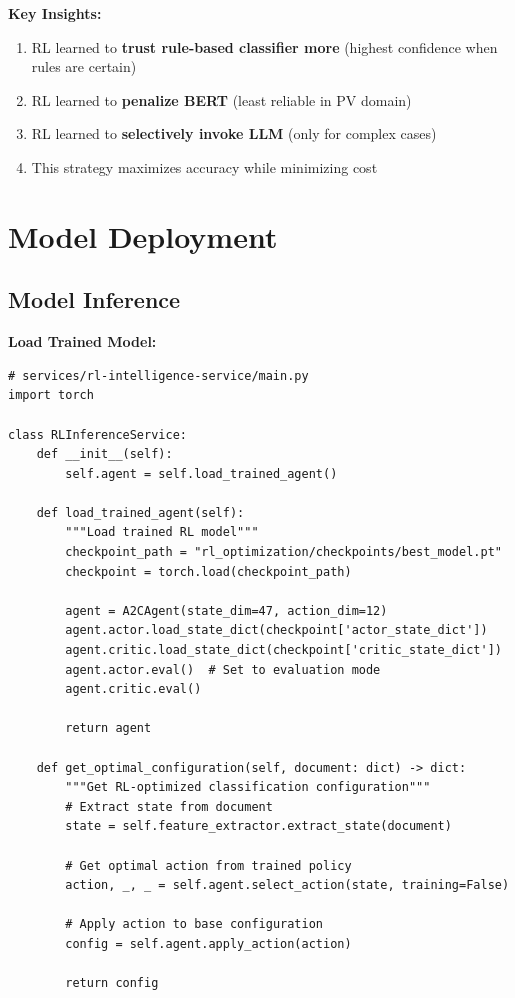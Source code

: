 \textbf{Key Insights:}
\begin{enumerate}
    \item RL learned to \textbf{trust rule-based classifier more} (highest confidence when rules are certain)
    \item RL learned to \textbf{penalize BERT} (least reliable in PV domain)
    \item RL learned to \textbf{selectively invoke LLM} (only for complex cases)
    \item This strategy maximizes accuracy while minimizing cost
\end{enumerate}

\section{Model Deployment}

\subsection{Model Inference}

\textbf{Load Trained Model:}
\begin{lstlisting}[style=pythonstyle]
# services/rl-intelligence-service/main.py
import torch

class RLInferenceService:
    def __init__(self):
        self.agent = self.load_trained_agent()
    
    def load_trained_agent(self):
        """Load trained RL model"""
        checkpoint_path = "rl_optimization/checkpoints/best_model.pt"
        checkpoint = torch.load(checkpoint_path)
        
        agent = A2CAgent(state_dim=47, action_dim=12)
        agent.actor.load_state_dict(checkpoint['actor_state_dict'])
        agent.critic.load_state_dict(checkpoint['critic_state_dict'])
        agent.actor.eval()  # Set to evaluation mode
        agent.critic.eval()
        
        return agent
    
    def get_optimal_configuration(self, document: dict) -> dict:
        """Get RL-optimized classification configuration"""
        # Extract state from document
        state = self.feature_extractor.extract_state(document)
        
        # Get optimal action from trained policy
        action, _, _ = self.agent.select_action(state, training=False)
        
        # Apply action to base configuration
        config = self.agent.apply_action(action)
        
        return config
\end{lstlisting}

